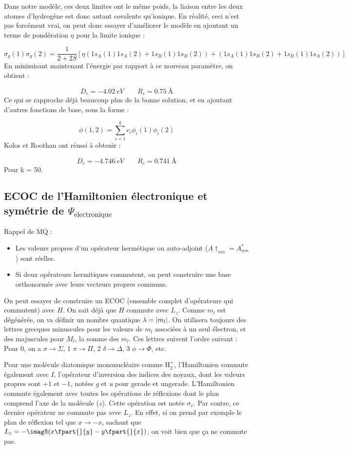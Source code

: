 Dans notre modèle, ces deux limites ont le même poids, la liaison entre les deux atomes d'hydrogène est donc autant covalente qu'ionique. En réalité, ceci n'est pas forcément vrai, on peut donc essayer d'améliorer le modèle en ajoutant un terme de pondération $\eta$ pour la limite ionique :

\[
    \sigma_g(1)\sigma_g(2) = \dfrac{1}{2+2S}[\eta(1s_A(1)1s_A(2)+1s_B(1)1s_B(2)) + (1s_A(1)1s_B(2)+1s_B(1)1s_A(2))]
\]
En minimisant maintenant l'énergie par rapport à ce nouveau paramètre, on obtient :

\[ D_e = \SI{-4.02}{eV} \quad \quad R_e = \SI{0.75}{\angstrom} \]
Ce qui se rapproche déjà beaucoup plus de la bonne solution, et en ajoutant d'autres fonctions de base, sous la forme :

\[ \phi(1,2) = \sum\limits_{i=1}^kc_i\phi_i(1)\phi_i(2) \]
Kolos et Roothan ont réussi à obtenir :

\[
D_e = \SI{-4.746}{eV} \quad \quad R_e = \SI{0.741}{\angstrom}
\]
Pour k = 50.


\subsection{ECOC de l'Hamiltonien électronique et symétrie de $\Psi_\text{electronique}$}


Rappel de MQ :
\begin{itemize}
    \item Les valeurs propres d'un opérateur hermétique ou auto-adjoint ($A\dagger_{mn} = A^*_{nm}$) sont réelles.
    \item Si deux opérateurs hermitiques commutent, on peut construire une base orthonormée avec leurs vecteurs propres communs.
\end{itemize}
On peut essayer de construire un ECOC (ensemble complet d'opérateurs qui commutent) avec $H$.
On sait déjà que $H$ commute avec $L_z$. Comme $m_l$ est dégénérée, on va définir un nombre quantique $\lambda = \abs{m_l}$. On utilisera toujours des lettres grecques minuscules pour les valeurs de $m_l$ associées à un seul électron, et des majuscules pour $M_l$, la somme des $m_l$. Ces lettres suivent l'ordre suivant :
Pour 0, on a $\sigma \rightarrow\Sigma$, 1 $\pi\rightarrow\Pi$, 2 $\delta\rightarrow\Delta$, 3 $\phi\rightarrow\Phi$, etc.


Pour une molécule diatomique mononucléaire comme H$_2^+$, l'Hamiltonien commute également avec $I$, l'opérateur d'inversion des indices des noyaux, dont les valeurs propres sont $+1$ et $-1$, notées \textit{g} et \textit{u} pour gerade et ungerade.
L'Hamiltonien commute également avec toutes les opérations de réflexions dont le plan comprend l'axe de la molécule ($z$). Cette opération est notée $\sigma_v$. Par contre, ce dernier opérateur ne commute pas avec $L_z$. En effet, si on prend par exemple le plan de réflexion tel que $x\rightarrow-x$, sachant que $L_z = -\imag\hbar(x\fpart{}{y}-y\fpart{}{x})$, on voit bien que ça ne commute pas.


